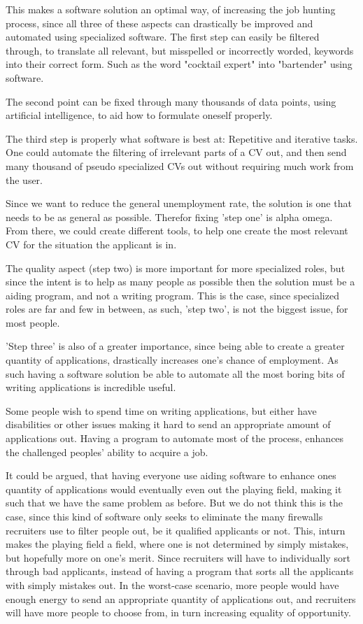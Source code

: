 This makes a software solution an optimal way, of increasing the job hunting
process, since all three of these aspects can drastically be improved and automated
using specialized software. 
The first step can easily be filtered through, to translate all relevant, but
misspelled or incorrectly worded, keywords into their correct form. Such
as the word "cocktail expert" into "bartender" using software.

The second point can be fixed through many thousands of data points, using
artificial intelligence, to aid how to formulate oneself properly. 

The third step is properly what software is best at: Repetitive and iterative
tasks.
One could automate the filtering of irrelevant parts of a CV out, and then send
many thousand of pseudo specialized CVs out without requiring much work from the
user.

Since we want to reduce the general unemployment rate, the solution is one that needs to 
be as general as possible. Therefor fixing 'step one' is alpha omega.
From there, we could create different tools, to help one create the most relevant
CV for the situation the applicant is in.

The quality aspect (step two) is more important for more specialized roles, 
but since the intent is to help as many people as possible then the solution
must be a aiding program, and not a writing program.
This is the case, since specialized roles are far and few in between,
as such, 'step two', is not the biggest issue, for most people. 

'Step three' is also of a greater importance, since being able to create a
greater quantity of applications, drastically increases one's chance of
employment. 
As such having a software solution be able to automate all the most boring
bits of writing applications is incredible useful.

Some people wish to spend time on writing applications, but either have
disabilities or other issues making it hard to send an appropriate amount
of applications out. Having a program to automate most of the process, enhances
the challenged peoples' ability to acquire a job.

It could be argued, that having everyone use aiding software to enhance ones
quantity of applications would eventually even out the playing field, making
it such that we have the same problem as before. 
But we do not think this is the case, since this kind of software only seeks
to eliminate the many firewalls recruiters use to filter people out, be it 
qualified applicants or not.
This, inturn makes the playing field a field, where one is not determined by
simply mistakes, but hopefully more on one's merit. Since recruiters will have to 
individually sort through bad applicants, instead of having a program that sorts
all the applicants with simply mistakes out. In the worst-case scenario, more
people would have enough energy to send an appropriate quantity of applications
out, and recruiters will have more people to choose from, in turn increasing
equality of opportunity.

